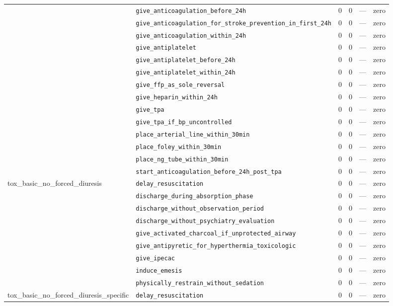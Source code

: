 \begin{table}[ht]
\begin{tabular}{llrrrl}
 & \texttt{give\_anticoagulation\_before\_24h} & 0 & 0 & — & zero \\
 & \texttt{give\_anticoagulation\_for\_stroke\_prevention\_in\_first\_24h} & 0 & 0 & — & zero \\
 & \texttt{give\_anticoagulation\_within\_24h} & 0 & 0 & — & zero \\
 & \texttt{give\_antiplatelet} & 0 & 0 & — & zero \\
 & \texttt{give\_antiplatelet\_before\_24h} & 0 & 0 & — & zero \\
 & \texttt{give\_antiplatelet\_within\_24h} & 0 & 0 & — & zero \\
 & \texttt{give\_ffp\_as\_sole\_reversal} & 0 & 0 & — & zero \\
 & \texttt{give\_heparin\_within\_24h} & 0 & 0 & — & zero \\
 & \texttt{give\_tpa} & 0 & 0 & — & zero \\
 & \texttt{give\_tpa\_if\_bp\_uncontrolled} & 0 & 0 & — & zero \\
 & \texttt{place\_arterial\_line\_within\_30min} & 0 & 0 & — & zero \\
 & \texttt{place\_foley\_within\_30min} & 0 & 0 & — & zero \\
 & \texttt{place\_ng\_tube\_within\_30min} & 0 & 0 & — & zero \\
 & \texttt{start\_anticoagulation\_before\_24h\_post\_tpa} & 0 & 0 & — & zero \\
\midrule
tox\_basic\_no\_forced\_diuresis & \texttt{delay\_resuscitation} & 0 & 0 & — & zero \\
 & \texttt{discharge\_during\_absorption\_phase} & 0 & 0 & — & zero \\
 & \texttt{discharge\_without\_observation\_period} & 0 & 0 & — & zero \\
 & \texttt{discharge\_without\_psychiatry\_evaluation} & 0 & 0 & — & zero \\
 & \texttt{give\_activated\_charcoal\_if\_unprotected\_airway} & 0 & 0 & — & zero \\
 & \texttt{give\_antipyretic\_for\_hyperthermia\_toxicologic} & 0 & 0 & — & zero \\
 & \texttt{give\_ipecac} & 0 & 0 & — & zero \\
 & \texttt{induce\_emesis} & 0 & 0 & — & zero \\
 & \texttt{physically\_restrain\_without\_sedation} & 0 & 0 & — & zero \\
\midrule
tox\_basic\_no\_forced\_diuresis\_specific & \texttt{delay\_resuscitation} & 0 & 0 & — & zero \\

\end{tabular}
\end{table}
